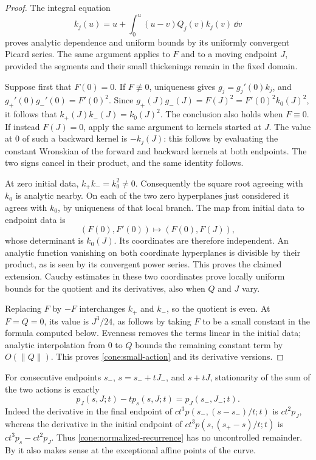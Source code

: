\begin{proof}
The integral equation
\[
 k_j(u)=u+\int_0^u(u-v)Q_j(v)k_j(v)\,\dd v
\]
proves analytic dependence and uniform bounds by its uniformly convergent
Picard series. The same argument applies to \(F\) and to a moving
endpoint \(J\), provided the segments and their small thickenings remain
in the fixed domain.

Suppose first that \(F(0)=0\). If \(F\not\equiv0\), uniqueness gives
\(g_j=g_j'(0)k_j\), and
\(g_+'(0)g_-'(0)=F'(0)^2\). Since
\(g_+(J)g_-(J)=F(J)^2=F'(0)^2k_0(J)^2\), it follows that
\(k_+(J)k_-(J)=k_0(J)^2\). The conclusion also holds when \(F\equiv0\).
If instead \(F(J)=0\), apply the same argument to kernels started at
\(J\). The value at \(0\) of such a backward kernel is \(-k_j(J)\):
this follows by evaluating the constant Wronskian of the forward and
backward kernels at both endpoints. The two signs cancel in their
product, and the same identity follows.

At zero initial data, \(k_+k_-=k_0^2\ne0\). Consequently the square root
agreeing with \(k_0\) is analytic nearby. On each of the two zero
hyperplanes just considered it agrees with \(k_0\), by uniqueness of
that local branch. The map from initial data to endpoint data is
\[
 (F(0),F'(0))\longmapsto(F(0),F(J)),
\]
whose determinant is \(k_0(J)\). Its coordinates are therefore
independent. An analytic function vanishing on both coordinate
hyperplanes is divisible by their product, as is seen by its convergent
power series. This proves the claimed extension. Cauchy estimates in
these two coordinates prove locally uniform bounds for the quotient
and its derivatives, also when \(Q\) and \(J\) vary.

Replacing \(F\) by \(-F\) interchanges \(k_+\) and \(k_-\), so the
quotient is even. At \(F=Q=0\), its value is \(J^3/24\), as follows by
taking \(F\) to be a small constant in the formula computed below.
Evenness removes the terms linear in the initial data; analytic
interpolation from \(0\) to \(Q\) bounds the remaining constant term by
\(O(\|Q\|)\). This proves \eqref{cone:small-action} and its derivative
versions.
\end{proof}

For consecutive endpoints \(s_-\), \(s=s_-+tJ_-\), and \(s+tJ\),
stationarity of the sum of the two actions is exactly
\begin{equation}\label{cone:normalized-recurrence}
 p_J(s,J;t)-t p_s(s,J;t)=p_J(s_-,J_-;t).
\end{equation}
Indeed the derivative in the final endpoint of
\(ct^3p(s_-,(s-s_-)/t;t)\) is \(ct^2p_J\), whereas the derivative in the
initial endpoint of \(ct^3p(s,(s_+-s)/t;t)\) is
\(ct^3p_s-ct^2p_J\). Thus \eqref{cone:normalized-recurrence} has no
uncontrolled remainder. By  it also makes
sense at the exceptional affine points of the curve.


